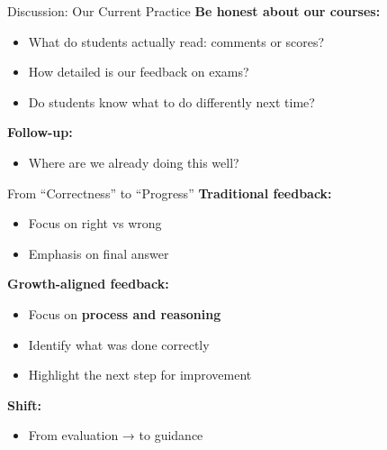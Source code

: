 \documentclass[dvipsnames]{beamer}
\begin{document}

\begin{frame}{Discussion: Our Current Practice}
\textbf{Be honest about our courses:}
\begin{itemize}
\item What do students actually read: comments or scores?
\item How detailed is our feedback on exams?
\item Do students know what to do differently next time?
\end{itemize}

\vspace{1em}

\textbf{Follow-up:}
\begin{itemize}
\item Where are we already doing this well?
\end{itemize}
\end{frame}


\begin{frame}{From “Correctness” to “Progress”}
\textbf{Traditional feedback:}
\begin{itemize}
\item Focus on right vs wrong
\item Emphasis on final answer
\end{itemize}

\vspace{1em}

\textbf{Growth-aligned feedback:}
\begin{itemize}
\item Focus on \textbf{process and reasoning}
\item Identify what was done correctly
\item Highlight the next step for improvement
\end{itemize}

\vspace{1em}

\textbf{Shift:}
\begin{itemize}
\item From evaluation → to guidance
\end{itemize}
\end{frame}



\end{document}
